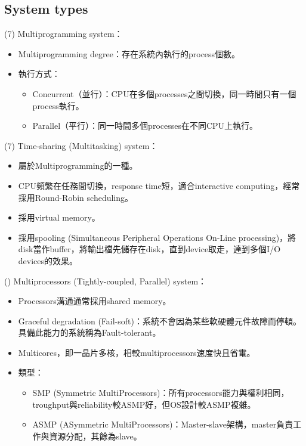 \subsection{System types}

\begin{theorem}{(7)} Multiprogramming system：\begin{itemize}
        \item Multiprogramming degree：存在系統內執行的process個數。
        \item 執行方式：\begin{itemize}
            \item Concurrent（並行）：CPU在多個processes之間切換，同一時間只有一個process執行。
            \item Parallel（平行）：同一時間多個processes在不同CPU上執行。
        \end{itemize}
    \end{itemize}
\end{theorem}

\begin{theorem}{(7)} Time-sharing (Multitasking) system：\begin{itemize}
        \item 屬於Multiprogramming的一種。
        \item CPU頻繁在任務間切換，response time短，適合interactive computing，經常採用Round-Robin scheduling。
        \item 採用virtual memory。
        \item 採用spooling (Simultaneous Peripheral Operations On-Line processing)，將disk當作buffer，將輸出檔先儲存在disk，直到device取走，達到多個I/O devices的效果。
    \end{itemize}
\end{theorem}

\begin{theorem}{()} Multiprocessors (Tightly-coupled, Parallel) system：\begin{itemize}
        \item Processors溝通通常採用shared memory。
        \item Graceful degradation (Fail-soft)：系統不會因為某些軟硬體元件故障而停頓。具備此能力的系統稱為Fault-tolerant。
        \item Multicores，即一晶片多核，相較multiprocessors速度快且省電。
        \item 類型：\begin{itemize}
            \item SMP (Symmetric MultiProcessors)：所有processors能力與權利相同，troughput與reliability較ASMP好，但OS設計較ASMP複雜。
            \item ASMP (ASymmetric MultiProcessors)：Master-slave架構，master負責工作與資源分配，其餘為slave。
        \end{itemize}
    \end{itemize}
\end{theorem}

